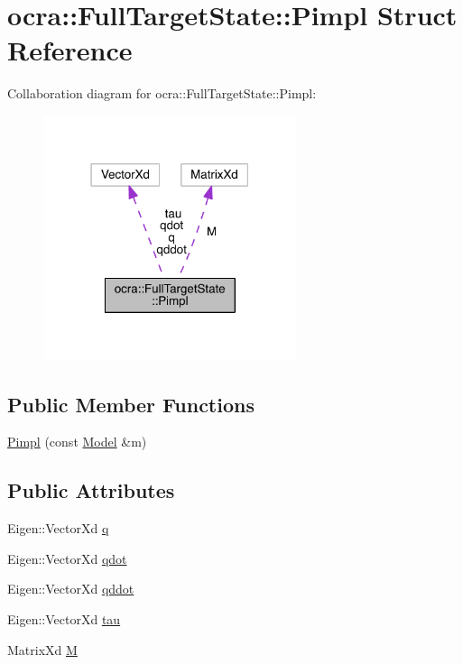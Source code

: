 \hypertarget{structocra_1_1FullTargetState_1_1Pimpl}{}\section{ocra\+:\+:Full\+Target\+State\+:\+:Pimpl Struct Reference}
\label{structocra_1_1FullTargetState_1_1Pimpl}


Collaboration diagram for ocra\+:\+:Full\+Target\+State\+:\+:Pimpl\+:\nopagebreak
\begin{figure}[H]
\begin{center}
\leavevmode
\includegraphics[width=210pt]{d2/dac/structocra_1_1FullTargetState_1_1Pimpl__coll__graph}
\end{center}
\end{figure}
\subsection*{Public Member Functions}
\begin{DoxyCompactItemize}
\item 
\hyperlink{structocra_1_1FullTargetState_1_1Pimpl_abf41bdded179528f89726ae9071f1377}{Pimpl} (const \hyperlink{classocra_1_1Model}{Model} \&m)
\end{DoxyCompactItemize}
\subsection*{Public Attributes}
\begin{DoxyCompactItemize}
\item 
Eigen\+::\+Vector\+Xd \hyperlink{structocra_1_1FullTargetState_1_1Pimpl_afb9abfe35480d2dea95ed9d54e8906df}{q}
\item 
Eigen\+::\+Vector\+Xd \hyperlink{structocra_1_1FullTargetState_1_1Pimpl_a2d1307a89fa37ddb50305785e7d91e68}{qdot}
\item 
Eigen\+::\+Vector\+Xd \hyperlink{structocra_1_1FullTargetState_1_1Pimpl_a6eb86dcb00ed58935f11c42f030645a3}{qddot}
\item 
Eigen\+::\+Vector\+Xd \hyperlink{structocra_1_1FullTargetState_1_1Pimpl_aae33a52895f1ead1be869d88b3e6ff9f}{tau}
\item 
Matrix\+Xd \hyperlink{structocra_1_1FullTargetState_1_1Pimpl_aaf42a0f7ecf1e3750695edc06fb06c11}{M}
\end{DoxyCompactItemize}


